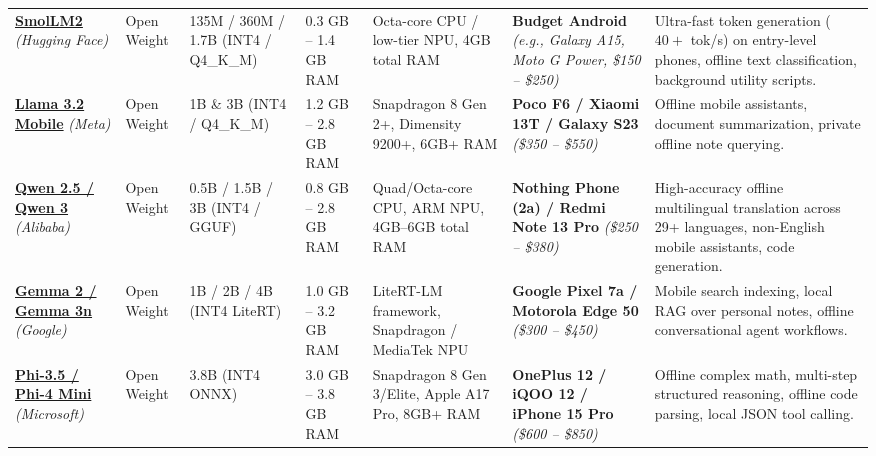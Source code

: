 \documentclass[10pt,landscape,a4paper]{article}
\begin{document}
\begin{longtable}{p{2.6cm} p{1.6cm} p{1.8cm} p{2.2cm} p{2.6cm} p{4.2cm} p{6.8cm}}
    \textbf{\href{https://huggingface.co/HuggingFaceTB/SmolLM2-1.7B-Instruct}{SmolLM2}} \newline \textit{(Hugging Face)} & Open Weight & 135M / 360M / 1.7B \newline (INT4 / Q4\_K\_M) & 0.3 GB -- 1.4 GB RAM & Octa-core CPU / low-tier NPU, 4GB total RAM & \textbf{Budget Android} \newline \textit{(e.g., Galaxy A15, Moto G Power, \$150 -- \$250)} & Ultra-fast token generation ($40+$ tok/s) on entry-level phones, offline text classification, background utility scripts. \\

    \textbf{\href{https://huggingface.co/meta-llama/Llama-3.2-3B-Instruct}{Llama 3.2 Mobile}} \newline \textit{(Meta)} & Open Weight & 1B \& 3B \newline (INT4 / Q4\_K\_M) & 1.2 GB -- 2.8 GB RAM & Snapdragon 8 Gen 2+, Dimensity 9200+, 6GB+ RAM & \textbf{Poco F6 / Xiaomi 13T / Galaxy S23} \newline \textit{(\$350 -- \$550)} & Offline mobile assistants, document summarization, private offline note querying. \\

    \textbf{\href{https://huggingface.co/Qwen/Qwen2.5-3B-Instruct-GGUF}{Qwen 2.5 / Qwen 3}} \newline \textit{(Alibaba)} & Open Weight & 0.5B / 1.5B / 3B \newline (INT4 / GGUF) & 0.8 GB -- 2.8 GB RAM & Quad/Octa-core CPU, ARM NPU, 4GB--6GB total RAM & \textbf{Nothing Phone (2a) / Redmi Note 13 Pro} \newline \textit{(\$250 -- \$380)} & High-accuracy offline multilingual translation across 29+ languages, non-English mobile assistants, code generation. \\

    \textbf{\href{https://ai.google.dev/gemma}{Gemma 2 / Gemma 3n}} \newline \textit{(Google)} & Open Weight & 1B / 2B / 4B \newline (INT4 LiteRT) & 1.0 GB -- 3.2 GB RAM & LiteRT-LM framework, Snapdragon / MediaTek NPU & \textbf{Google Pixel 7a / Motorola Edge 50} \newline \textit{(\$300 -- \$450)} & Mobile search indexing, local RAG over personal notes, offline conversational agent workflows. \\

    \textbf{\href{https://huggingface.co/microsoft/Phi-3.5-mini-instruct}{Phi-3.5 / Phi-4 Mini}} \newline \textit{(Microsoft)} & Open Weight & 3.8B \newline (INT4 ONNX) & 3.0 GB -- 3.8 GB RAM & Snapdragon 8 Gen 3/Elite, Apple A17 Pro, 8GB+ RAM & \textbf{OnePlus 12 / iQOO 12 / iPhone 15 Pro} \newline \textit{(\$600 -- \$850)} & Offline complex math, multi-step structured reasoning, offline code parsing, local JSON tool calling. \\


\end{longtable}
\end{document}
